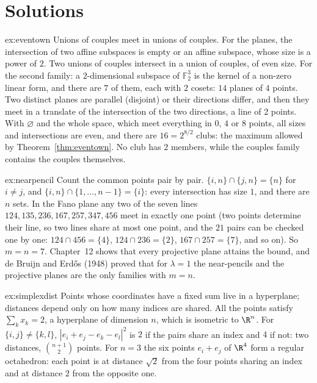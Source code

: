 \section{Solutions}

\begin{solution}{ex:eventown}
\idea Unions of couples meet in unions of couples. For the planes, the intersection of two affine subspaces is empty or an affine subspace, whose size is a power of $2$.
\writeup Two unions of couples intersect in a union of couples, of even size. For the second family: a $2$-dimensional subspace of $\mathbb F_2^3$ is the kernel of a non-zero linear form, and there are $7$ of them, each with
$2$ cosets: $14$ planes of $4$ points. Two distinct planes are parallel (disjoint) or their directions differ, and then they meet in a translate of the intersection of the two directions, a line of $2$ points. With
$\varnothing$ and the whole space, which meet everything in $0$, $4$ or $8$ points, all sizes and intersections are even, and there are $16=2^{8/2}$ clubs: the maximum allowed by Theorem~\ref{thm:eventown}. No club has $2$
members, while the couples family contains the couples themselves.
\end{solution}

\begin{solution}{ex:nearpencil}
\idea Count the common points pair by pair.
\writeup $\{i,n\}\cap\{j,n\}=\{n\}$ for $i\ne j$, and $\{i,n\}\cap\{1,\dots,n-1\}=\{i\}$: every intersection has size $1$, and there are $n$ sets. In the Fano plane any two of the seven lines
$124,135,236,167,257,347,456$ meet in exactly one point (two points determine their line, so two lines share at most one point, and the $21$ pairs can be checked one by one: $124\cap456=\{4\}$, $124\cap236=\{2\}$, $167\cap257=\{7\}$, and so on). So $m=n=7$. Chapter~12 shows
that every projective plane attains the bound, and de Bruijn and Erd\H os (1948) proved that for $\lambda=1$ the near-pencils and the projective planes are the only families with $m=n$.
\end{solution}

\begin{solution}{ex:simplexdist}
\idea Points whose coordinates have a fixed sum live in a hyperplane; distances depend only on how many indices are shared.
\writeup All the points satisfy $\sum_kx_k=2$, a hyperplane of dimension $n$, which is isometric to $\R^n$. For $\{i,j\}\ne\{k,l\}$, $|e_i+e_j-e_k-e_l|^2$ is $2$ if the pairs share an index and $4$ if not: two distances,
$\binom{n+1}2$ points. For $n=3$ the six points $e_i+e_j$ of $\R^4$ form a regular octahedron: each point is at distance $\sqrt2$ from the four points sharing an index and at distance $2$ from the opposite one.
\end{solution}

